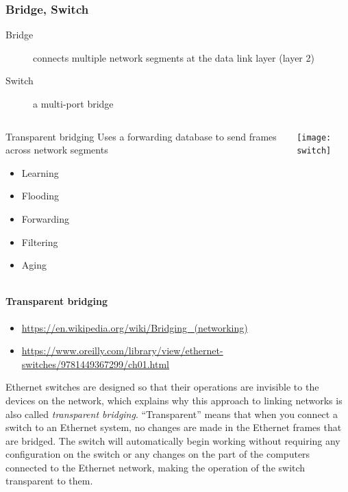 \subsubsection{Bridge, Switch}

\begin{frame}
  \begin{description}
  \item[Bridge] connects multiple network segments at the data link layer (layer 2)
  \item[Switch] a multi-port bridge
  \end{description}
  \begin{columns}[b]
    \begin{column}{.45\linewidth}
      \begin{block}{Transparent bridging}
        Uses a forwarding database to send frames across network segments
        \begin{itemize}
        \item Learning
        \item Flooding
        \item Forwarding
        \item Filtering
        \item Aging
        \end{itemize}
      \end{block}
    \end{column}
    \begin{column}{.55\linewidth}
      \texttt{[image: switch]}
    \end{column}
  \end{columns}
\end{frame}

\paragraph{Transparent bridging}

\begin{itemize}
\item \url{https://en.wikipedia.org/wiki/Bridging_(networking)}
\item \url{https://www.oreilly.com/library/view/ethernet-switches/9781449367299/ch01.html}
\end{itemize}

Ethernet switches are designed so that their operations are invisible to the devices on
the network, which explains why this approach to linking networks is also called
\emph{transparent bridging}. “Transparent” means that when you connect a switch to an Ethernet
system, no changes are made in the Ethernet frames that are bridged. The switch will
automatically begin working without requiring any configuration on the switch or any
changes on the part of the computers connected to the Ethernet network, making the
operation of the switch transparent to them.

